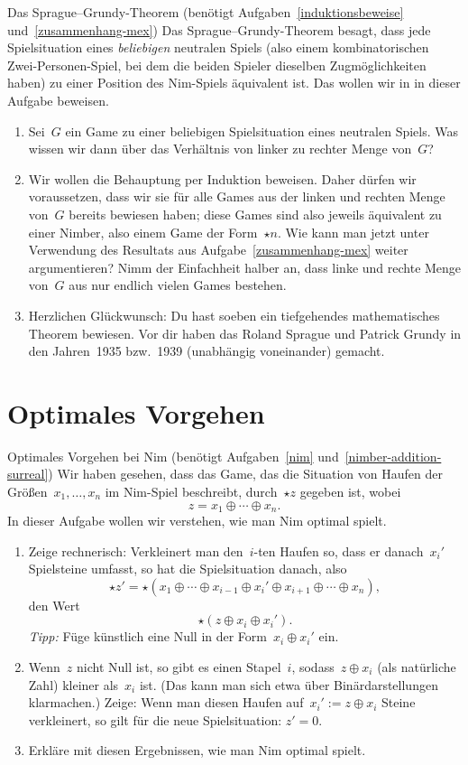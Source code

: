 \documentclass{zirkelblatt}
\newcommand{\head}[1]{\section*{\rmfamily #1}}%
\begin{document}
\begin{aufgabe}{Das Sprague--Grundy-Theorem
(benötigt Aufgaben~\ref{induktionsbeweise} und~\ref{zusammenhang-mex})}
\label{sprague-grundy}
Das Sprague--Grundy-Theorem besagt, dass jede Spielsituation eines
\emph{beliebigen} neutralen Spiels (also einem
kombinatorischen Zwei-Personen-Spiel, bei dem die beiden Spieler dieselben
Zugmöglichkeiten haben) zu einer Position des Nim-Spiels äquivalent ist. Das
wollen wir in in dieser Aufgabe beweisen.
\begin{enumerate}
\item Sei~$G$ ein Game zu einer beliebigen Spielsituation eines neutralen
Spiels. Was wissen wir dann über das Verhältnis von linker zu rechter Menge
von~$G$?
\item Wir wollen die Behauptung per Induktion beweisen. Daher dürfen wir
voraussetzen, dass wir sie für alle Games aus der linken und rechten Menge
von~$G$ bereits bewiesen haben; diese Games sind also jeweils äquivalent zu
einer Nimber, also einem Game der Form~$\star n$. Wie kann man jetzt unter
Verwendung des Resultats aus Aufgabe~\ref{zusammenhang-mex} weiter argumentieren?
Nimm der Einfachheit halber an, dass linke und rechte Menge von~$G$ aus nur
endlich vielen Games bestehen.
\item Herzlichen Glückwunsch: Du hast soeben ein tiefgehendes mathematisches
Theorem bewiesen. Vor dir haben das Roland Sprague und Patrick Grundy in den
Jahren~1935 bzw.~1939 (unabhängig voneinander) gemacht.
\end{enumerate}
\end{aufgabe}


\head{Optimales Vorgehen}

\begin{aufgabe}{Optimales Vorgehen bei Nim
(benötigt Aufgaben~\ref{nim} und~\ref{nimber-addition-surreal})}
\label{nim-optimal}
Wir haben gesehen, dass das Game, das die Situation von Haufen der
Größen~$x_1,\ldots,x_n$ im Nim-Spiel beschreibt, durch~$\star z$ gegeben ist,
wobei
\[ z = x_1 \oplus \cdots \oplus x_n. \]
In dieser Aufgabe wollen wir verstehen, wie man Nim optimal
spielt.
\begin{enumerate}
\item Zeige rechnerisch: Verkleinert man den~$i$-ten Haufen so, dass er
danach~$x_i'$ Spielsteine umfasst, so hat die Spielsituation danach, also
\[ \star z' = \star(x_1 \oplus \cdots \oplus x_{i-1} \oplus x_i' \oplus x_{i+1} \oplus
\cdots \oplus x_n), \]
den Wert
\[ \star(z \oplus x_i \oplus x_i'). \]
\emph{Tipp:} Füge künstlich eine Null in der Form~$x_i \oplus x_i'$ ein.
\item Wenn~$z$ nicht Null ist, so gibt es einen Stapel~$i$, sodass~$z \oplus
x_i$ (als natürliche Zahl) kleiner als~$x_i$ ist. (Das kann man sich etwa über
Binärdarstellungen klarmachen.) Zeige: Wenn man diesen Haufen auf~$x_i' :=
z \oplus x_i$ Steine verkleinert, so gilt für die neue Spielsituation: $z' =
0$.
\item Erkläre mit diesen Ergebnissen, wie man Nim optimal spielt.
\end{enumerate}
\end{aufgabe}
\end{document}
